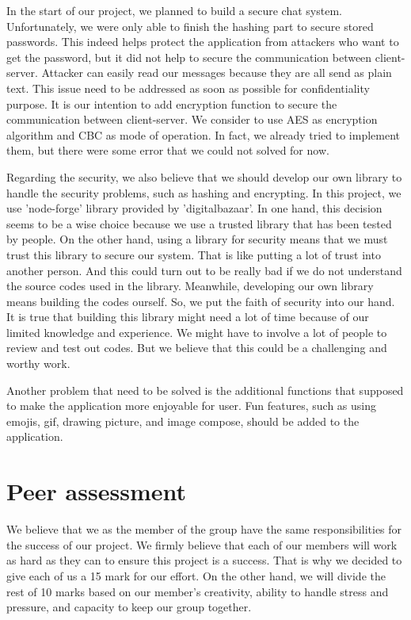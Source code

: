 \documentclass[a4paper,11pt]{article}
\begin{document}
In the start of our project, we planned to build a secure chat system. Unfortunately, we were only able to finish the hashing part to secure stored passwords. This indeed helps protect the application from attackers who want to get the password, but it did not help to secure the communication between client-server. Attacker can easily read our messages because they are all send as plain text. This issue need to be addressed as soon as possible for confidentiality purpose. It is our intention to add encryption function to secure the communication between client-server. We consider to use AES as encryption algorithm and CBC as mode of operation. In fact, we already tried to implement them, but there were some error that we could not solved for now.

Regarding the security, we also believe that we should develop our own library to handle the security problems, such as hashing and encrypting. In this project, we use 'node-forge' library provided by 'digitalbazaar'. In one hand, this decision seems to be a wise choice because we use a trusted library that has been tested by people. On the other hand, using a library for security means that we must trust this library to secure our system. That is like putting a lot of trust into another person. And this could turn out to be really bad if we do not understand the source codes used in the library. Meanwhile, developing our own library means building the codes ourself. So, we put the faith of security into our hand. It is true that building this library might need a lot of time because of our limited knowledge and experience. We might have to involve a lot of people to review and test out codes. But we believe that this could be a challenging and worthy work.

Another problem that need to be solved is the additional functions that supposed to make the application more enjoyable for user. Fun features, such as using emojis, gif, drawing picture, and image compose, should be added to the application.


\section{Peer assessment}
We believe that we as the member of the group have the same responsibilities for the success of our project. We firmly believe that each of our members will work as hard as they can to ensure this project is a success. That is why we decided to give each of us a 15 mark for our effort. On the other hand, we will divide the rest of 10 marks based on our member’s creativity, ability to handle stress and pressure, and capacity to keep our group together. 
\end{document}
